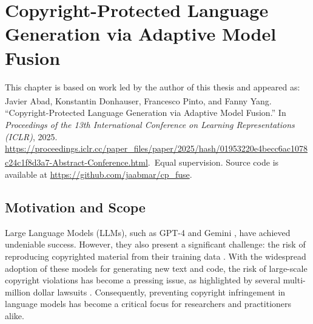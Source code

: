 \chapter{Copyright-Protected Language Generation via Adaptive Model Fusion}
\label{chap:cpfuse}


\chapterpublication
  {This chapter is based on work led by the author of this thesis and appeared as:}
  {Javier Abad, Konstantin Donhauser, Francesco Pinto\textsuperscript{\dag}, and Fanny Yang\textsuperscript{\dag}. ``Copyright-Protected Language Generation via Adaptive Model Fusion.'' In \emph{Proceedings of the 13th International Conference on Learning Representations (ICLR)}, 2025. \url{https://proceedings.iclr.cc/paper_files/paper/2025/hash/01953220e4becc6ac1078c24c1f8d3a7-Abstract-Conference.html}. {\footnotesize\textsuperscript{\dag}\,Equal supervision.} Source code is available at \url{https://github.com/jaabmar/cp_fuse}.}

\vspace{-0.6\baselineskip}
\section{Motivation and Scope}

Large Language Models (LLMs), such as GPT-4 \citep{achiam2023gpt} and Gemini \citep{team2023gemini}, have achieved undeniable success. However, they also present a significant challenge: the risk of reproducing copyrighted material from their training data \citep{sag66new,yu2023codeiipprompt,karamolegkou2023copyright}. With the widespread adoption of these models for generating new text and code, the risk of large-scale copyright violations has become a pressing issue, as highlighted by several multi-million dollar lawsuits \citep{henderson2023foundation}. Consequently, preventing copyright infringement in language models has become a critical focus for researchers and practitioners alike.

